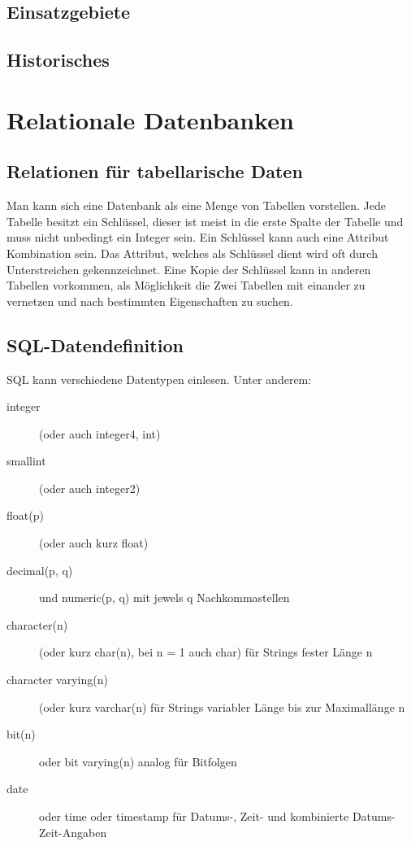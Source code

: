 \documentclass[12pt,a4paper]{article} %
\begin{document}
	\subsection{Einsatzgebiete}
	
	\subsection{Historisches}
	
	\newpage
	\section{Relationale Datenbanken}
	\subsection{Relationen für tabellarische Daten}
	Man kann sich eine Datenbank als eine Menge von Tabellen vorstellen. Jede Tabelle besitzt ein Schlüssel, dieser ist meist in die erste Spalte der Tabelle und muss nicht unbedingt ein Integer sein. Ein Schlüssel kann auch eine Attribut Kombination sein. Das Attribut, welches als Schlüssel dient wird oft durch Unterstreichen gekennzeichnet. Eine Kopie der Schlüssel kann in anderen Tabellen vorkommen, als Möglichkeit die Zwei Tabellen mit einander zu vernetzen und nach bestimmten Eigenschaften zu suchen.
	
	\subsection{SQL-Datendefinition}
	SQL kann verschiedene Datentypen einlesen. Unter anderem:
	\begin{description}
		\item[integer] (oder auch integer4, int)
		\item[smallint] (oder auch integer2)
		\item[float(p)] (oder auch kurz float)
		\item[decimal(p, q)] und numeric(p, q) mit jewels q Nachkommastellen
		\item[character(n)] (oder kurz char(n), bei n = 1 auch char) für Strings fester Länge n
		\item[character varying(n)] (oder kurz varchar(n) für Strings variabler Länge bis zur Maximallänge n
		\item[bit(n)] oder bit varying(n) analog für Bitfolgen
		\item[date] oder time oder timestamp für Datums-, Zeit- und kombinierte Datums-Zeit-Angaben
	\end{description}
	
\end{document}
